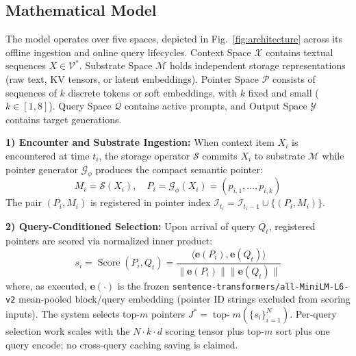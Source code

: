 \documentclass[conference]{IEEEtran}
\begin{document}
\subsection{Mathematical Model}
The model operates over five spaces, depicted in Fig.~\ref{fig:architecture} across its offline ingestion and online query lifecycles. Context Space $\mathcal{X}$ contains textual sequences $X \in \mathcal{V}^*$. Substrate Space $\mathcal{M}$ holds independent storage representations (raw text, KV tensors, or latent embeddings). Pointer Space $\mathcal{P}$ consists of sequences of $k$ discrete tokens or soft embeddings, with $k$ fixed and small ($k \in [1, 8]$). Query Space $\mathcal{Q}$ contains active prompts, and Output Space $\mathcal{Y}$ contains target generations.

\noindent\textbf{1) Encounter and Substrate Ingestion:}
When context item $X_i$ is encountered at time $t_i$, the storage operator $\mathcal{S}$ commits $X_i$ to substrate $\mathcal{M}$ while pointer generator $\mathcal{G}_{\phi}$ produces the compact semantic pointer:
\begin{equation}
M_i = \mathcal{S}(X_i), \quad P_i = \mathcal{G}_{\phi}(X_i) = (p_{i,1}, \dots, p_{i,k})
\end{equation}
The pair $(P_i, M_i)$ is registered in pointer index $\mathcal{I}_{t_i} = \mathcal{I}_{t_{i}-1} \cup \{(P_i, M_i)\}$.

\noindent\textbf{2) Query-Conditioned Selection:}
Upon arrival of query $Q_t$, registered pointers are scored via normalized inner product:
\begin{equation}\label{eq:scoring}
s_i = \operatorname{Score}(P_i, Q_t) = \frac{\langle \mathbf{e}(P_i), \mathbf{e}(Q_t) \rangle}{\|\mathbf{e}(P_i)\| \|\mathbf{e}(Q_t)\|}
\end{equation}
where, as executed, $\mathbf{e}(\cdot)$ is the frozen \texttt{sentence-transformers/all-MiniLM-L6-v2} mean-pooled block/query embedding (pointer ID strings excluded from scoring inputs). The system selects top-$m$ pointers $J^* = \operatorname{top-}m (\{s_i\}_{i=1}^N)$. Per-query selection work scales with the $N{\cdot}k{\cdot}d$ scoring tensor plus top-$m$ sort plus one query encode; no cross-query caching saving is claimed.
\end{document}
